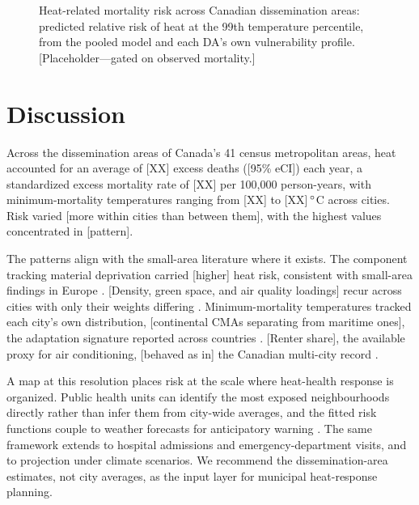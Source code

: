 \documentclass[12pt]{article}
\begin{document}
\begin{figure}[H]
\centering
\caption{Heat-related mortality risk across Canadian
dissemination areas: predicted relative risk of heat at the 99th
temperature percentile, from the pooled model and each DA's own
vulnerability profile. [Placeholder---gated on observed
mortality.]}
\label{fig:map}
\end{figure}


\section{Discussion}

Across the dissemination areas of Canada's 41 census
metropolitan areas, heat accounted for an average of [XX] excess
deaths ([95\% eCI]) each year, a standardized excess mortality
rate of [XX] per 100,000 person-years, with minimum-mortality
temperatures ranging from [XX] to [XX]$\,\degree$C across cities.
Risk varied [more within cities than between them], with the
highest values concentrated in [pattern].

The patterns align with the small-area literature where it
exists. The component tracking material deprivation carried
[higher] heat risk, consistent with small-area findings in
Europe \citep{gasparrini2022smallarea, zhang2023cvdeurope}. [Density,
green space, and air quality loadings] recur across cities with
only their weights differing \citep{sera2019urban}.
Minimum-mortality temperatures tracked each city's own
distribution, [continental CMAs separating from maritime ones],
the adaptation signature reported across countries
\citep{gasparrini2012mvmeta}. [Renter share], the available
proxy for air conditioning, [behaved as in] the Canadian
multi-city record \citep{quick2024twelvecities}.

A map at this resolution places risk at the scale where
heat-health response is organized. Public health units can
identify the most exposed neighbourhoods directly rather than
infer them from city-wide averages, and the fitted risk
functions couple to weather forecasts for anticipatory warning
\citep{mistry2024forecast}. The same framework extends to
hospital admissions and emergency-department visits, and to
projection under climate scenarios. We recommend the
dissemination-area estimates, not city averages, as the input
layer for municipal heat-response planning.
\end{document}
